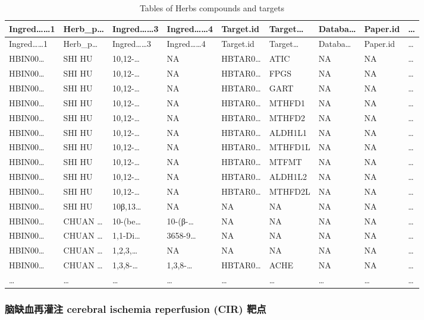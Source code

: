 \documentclass[
]{article}
\begin{document}
\begin{longtable}[]{@{}lllllllll@{}}
\caption{\label{tab:tables-of-Herbs-compounds-and-targets}Tables of Herbs compounds and targets}\tabularnewline
\toprule
Ingred\ldots\ldots1 & Herb\_p\ldots{} & Ingred\ldots\ldots3 & Ingred\ldots\ldots4 & Target.id & Target\ldots{} & Databa\ldots{} & Paper.id & \ldots{}\tabularnewline
\midrule
\endfirsthead
\toprule
Ingred\ldots\ldots1 & Herb\_p\ldots{} & Ingred\ldots\ldots3 & Ingred\ldots\ldots4 & Target.id & Target\ldots{} & Databa\ldots{} & Paper.id & \ldots{}\tabularnewline
\midrule
\endhead
HBIN00\ldots{} & SHI HU & 10,12-\ldots{} & NA & HBTAR0\ldots{} & ATIC & NA & NA & \ldots{}\tabularnewline
HBIN00\ldots{} & SHI HU & 10,12-\ldots{} & NA & HBTAR0\ldots{} & FPGS & NA & NA & \ldots{}\tabularnewline
HBIN00\ldots{} & SHI HU & 10,12-\ldots{} & NA & HBTAR0\ldots{} & GART & NA & NA & \ldots{}\tabularnewline
HBIN00\ldots{} & SHI HU & 10,12-\ldots{} & NA & HBTAR0\ldots{} & MTHFD1 & NA & NA & \ldots{}\tabularnewline
HBIN00\ldots{} & SHI HU & 10,12-\ldots{} & NA & HBTAR0\ldots{} & MTHFD2 & NA & NA & \ldots{}\tabularnewline
HBIN00\ldots{} & SHI HU & 10,12-\ldots{} & NA & HBTAR0\ldots{} & ALDH1L1 & NA & NA & \ldots{}\tabularnewline
HBIN00\ldots{} & SHI HU & 10,12-\ldots{} & NA & HBTAR0\ldots{} & MTHFD1L & NA & NA & \ldots{}\tabularnewline
HBIN00\ldots{} & SHI HU & 10,12-\ldots{} & NA & HBTAR0\ldots{} & MTFMT & NA & NA & \ldots{}\tabularnewline
HBIN00\ldots{} & SHI HU & 10,12-\ldots{} & NA & HBTAR0\ldots{} & ALDH1L2 & NA & NA & \ldots{}\tabularnewline
HBIN00\ldots{} & SHI HU & 10,12-\ldots{} & NA & HBTAR0\ldots{} & MTHFD2L & NA & NA & \ldots{}\tabularnewline
HBIN00\ldots{} & SHI HU & 10β,13\ldots{} & NA & NA & NA & NA & NA & \ldots{}\tabularnewline
HBIN00\ldots{} & CHUAN \ldots{} & 10-(be\ldots{} & 10-(β-\ldots{} & NA & NA & NA & NA & \ldots{}\tabularnewline
HBIN00\ldots{} & CHUAN \ldots{} & 1,1-Di\ldots{} & 3658-9\ldots{} & NA & NA & NA & NA & \ldots{}\tabularnewline
HBIN00\ldots{} & CHUAN \ldots{} & 1,2,3,\ldots{} & NA & NA & NA & NA & NA & \ldots{}\tabularnewline
HBIN00\ldots{} & CHUAN \ldots{} & 1,3,8-\ldots{} & 1,3,8-\ldots{} & HBTAR0\ldots{} & ACHE & NA & NA & \ldots{}\tabularnewline
\ldots{} & \ldots{} & \ldots{} & \ldots{} & \ldots{} & \ldots{} & \ldots{} & \ldots{} & \ldots{}\tabularnewline
\bottomrule
\end{longtable}

\hypertarget{ux8111ux7f3aux8840ux518dux704cux6ce8-cerebral-ischemia-reperfusion-cir-ux9776ux70b9}{%
\subsubsection{脑缺血再灌注 cerebral ischemia reperfusion (CIR) 靶点}\label{ux8111ux7f3aux8840ux518dux704cux6ce8-cerebral-ischemia-reperfusion-cir-ux9776ux70b9}}
\end{document}
